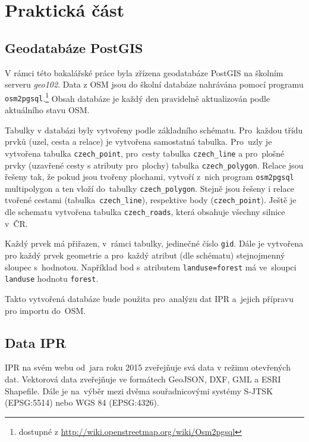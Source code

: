 \chapter{Praktická část}
\label{4-Praktická část}

\section{Geodatabáze PostGIS}
\label{Server PostGIS} 
V rámci této bakalářské práce byla zřízena geodatabáze PostGIS na školním
serveru {\em geo102}. Data z OSM jsou do školní databáze nahrávána pomocí programu {\tt osm2pgsql}.\footnote{dostupné z \url{http://wiki.openstreetmap.org/wiki/Osm2pgsql}}
Obsah databáze je každý den pravidelně aktualizován podle aktuálního stavu OSM.

Tabulky v databázi byly vytvořeny podle základního schématu. Pro~každou třídu prvků (uzel, cesta
a relace) je vytvořena samostatná tabulka. Pro~uzly je vytvořena
tabulka {\tt czech\_point}, pro~cesty tabulka {\tt czech\_line} a pro~plošné prvky (uzavřené cesty s atributy
pro~plochy) tabulka {\tt czech\_polygon}. Relace jsou
řešeny tak, že pokud jsou tvořeny plochami, vytvoří z~nich program
{\tt osm2pgsql} multipolygon a ten vloží do~tabulky {\tt czech\_polygon}. Stejně jsou
řešeny i relace tvořené cestami (tabulka~{\tt czech\_line}), respektive body
({\tt czech\_point}). Ještě je dle schematu vytvořena tabulka
{\tt czech\_roads}, která obsahuje všechny silnice v~ČR.

Každý prvek má přiřazen, v~rámci tabulky, jedinečné číslo {\tt gid}.
Dále je vytvořena pro každý prvek geometrie a pro~každý
atribut (dle schématu) stejnojmenný sloupec s~hodnotou. Například
bod s~atributem {\tt landuse=forest} má ve~sloupci {\tt landuse}
hodnotu {\tt forest}.

Takto vytvořená databáze bude použita pro~analýzu dat IPR a~jejich přípravu pro importu do~OSM.

\section{Data IPR}
\label{IPR data}
IPR na svém webu od~jara roku 2015 zveřejňuje svá data v režimu otevřených dat. Vektorová data zveřejňuje ve formátech GeoJSON, DXF, GML a ESRI Shapefile. Dále je na~výběr mezi dvěma
souřadnicovými systémy S-JTSK (EPSG:5514) nebo WGS 84 (EPSG:4326).

